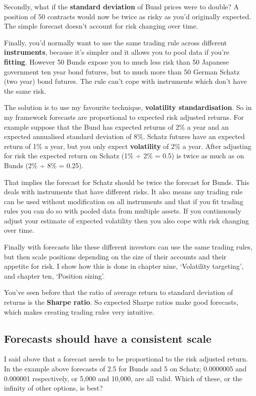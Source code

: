 Secondly, what if the \textbf{standard deviation} of Bund prices were to double? A position of 50 contracts would now be twice as risky as you'd originally expected. The simple forecast doesn't account for risk changing over time.

Finally, you'd normally want to use the same trading rule across different \textbf{instruments}, because it's simpler and it allows you to pool data if you're \textbf{fitting}. However 50 Bunds expose you to much less risk than 50 Japanese government ten year bond futures, but to much more than 50 German Schatz (two year) bond futures. The rule can't cope with instruments which don't have the same risk.

The solution is to use my favourite technique, \textbf{volatility standardisation}. So in my framework forecasts are proportional to expected risk adjusted returns. For example suppose that the Bund has expected returns of 2\% a year and an expected annualised standard deviation of 8\%. Schatz futures have an expected return of 1\% a year, but you only expect \textbf{volatility} of 2\% a year. After adjusting for risk the expected return on Schatz (1\% ÷ 2\% = 0.5) is twice as much as on Bunds (2\% ÷ 8\% = 0.25).

That implies the forecast for Schatz should be twice the forecast for Bunds. This deals with instruments that have different risks. It also means any trading rule can be used without modification on all instruments and that if you fit trading rules you can do so with pooled data from multiple assets. If you continuously adjust your estimate of expected volatility then you also cope with risk changing over time.

Finally with forecasts like these different investors can use the same trading rules, but then scale positions depending on the size of their accounts and their appetite for risk. I show how this is done in chapter nine, ‘Volatility targeting', and chapter ten, ‘Position sizing'. 

You've seen before that the ratio of average return to standard deviation of returns is the \textbf{Sharpe ratio}. So expected Sharpe ratios make good forecasts, which makes creating trading rules very intuitive.

\subsection*{Forecasts should have a consistent scale}

I said above that a forecast needs to be proportional to the risk adjusted return. In the example above forecasts of 2.5 for Bunds and 5 on Schatz; 0.0000005 and 0.000001 respectively, or 5,000 and 10,000, are all valid. Which of these, or the infinity of other options, is best?


